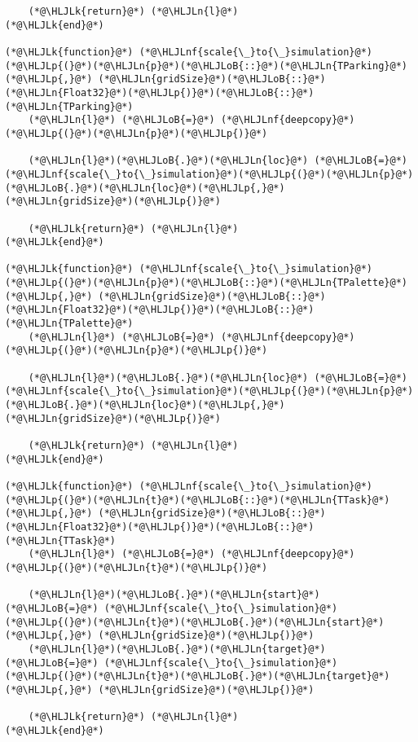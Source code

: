 \documentclass[12pt,a4paper]{article}
\newcommand{\HLJLk}[1]{\textcolor[RGB]{148,91,176}{\textbf{#1}}}
\newcommand{\HLJLn}[1]{#1}
\newcommand{\HLJLnf}[1]{\textcolor[RGB]{66,102,213}{#1}}
\newcommand{\HLJLoB}[1]{\textcolor[RGB]{102,102,102}{\textbf{#1}}}
\newcommand{\HLJLp}[1]{#1}
\begin{document}
\begin{lstlisting}
    (*@\HLJLk{return}@*) (*@\HLJLn{l}@*)
(*@\HLJLk{end}@*)

(*@\HLJLk{function}@*) (*@\HLJLnf{scale{\_}to{\_}simulation}@*)(*@\HLJLp{(}@*)(*@\HLJLn{p}@*)(*@\HLJLoB{::}@*)(*@\HLJLn{TParking}@*)(*@\HLJLp{,}@*) (*@\HLJLn{gridSize}@*)(*@\HLJLoB{::}@*)(*@\HLJLn{Float32}@*)(*@\HLJLp{)}@*)(*@\HLJLoB{::}@*)(*@\HLJLn{TParking}@*)
    (*@\HLJLn{l}@*) (*@\HLJLoB{=}@*) (*@\HLJLnf{deepcopy}@*)(*@\HLJLp{(}@*)(*@\HLJLn{p}@*)(*@\HLJLp{)}@*)

    (*@\HLJLn{l}@*)(*@\HLJLoB{.}@*)(*@\HLJLn{loc}@*) (*@\HLJLoB{=}@*) (*@\HLJLnf{scale{\_}to{\_}simulation}@*)(*@\HLJLp{(}@*)(*@\HLJLn{p}@*)(*@\HLJLoB{.}@*)(*@\HLJLn{loc}@*)(*@\HLJLp{,}@*) (*@\HLJLn{gridSize}@*)(*@\HLJLp{)}@*)

    (*@\HLJLk{return}@*) (*@\HLJLn{l}@*)
(*@\HLJLk{end}@*)

(*@\HLJLk{function}@*) (*@\HLJLnf{scale{\_}to{\_}simulation}@*)(*@\HLJLp{(}@*)(*@\HLJLn{p}@*)(*@\HLJLoB{::}@*)(*@\HLJLn{TPalette}@*)(*@\HLJLp{,}@*) (*@\HLJLn{gridSize}@*)(*@\HLJLoB{::}@*)(*@\HLJLn{Float32}@*)(*@\HLJLp{)}@*)(*@\HLJLoB{::}@*)(*@\HLJLn{TPalette}@*)
    (*@\HLJLn{l}@*) (*@\HLJLoB{=}@*) (*@\HLJLnf{deepcopy}@*)(*@\HLJLp{(}@*)(*@\HLJLn{p}@*)(*@\HLJLp{)}@*)

    (*@\HLJLn{l}@*)(*@\HLJLoB{.}@*)(*@\HLJLn{loc}@*) (*@\HLJLoB{=}@*) (*@\HLJLnf{scale{\_}to{\_}simulation}@*)(*@\HLJLp{(}@*)(*@\HLJLn{p}@*)(*@\HLJLoB{.}@*)(*@\HLJLn{loc}@*)(*@\HLJLp{,}@*) (*@\HLJLn{gridSize}@*)(*@\HLJLp{)}@*)

    (*@\HLJLk{return}@*) (*@\HLJLn{l}@*)
(*@\HLJLk{end}@*)

(*@\HLJLk{function}@*) (*@\HLJLnf{scale{\_}to{\_}simulation}@*)(*@\HLJLp{(}@*)(*@\HLJLn{t}@*)(*@\HLJLoB{::}@*)(*@\HLJLn{TTask}@*)(*@\HLJLp{,}@*) (*@\HLJLn{gridSize}@*)(*@\HLJLoB{::}@*)(*@\HLJLn{Float32}@*)(*@\HLJLp{)}@*)(*@\HLJLoB{::}@*)(*@\HLJLn{TTask}@*)
    (*@\HLJLn{l}@*) (*@\HLJLoB{=}@*) (*@\HLJLnf{deepcopy}@*)(*@\HLJLp{(}@*)(*@\HLJLn{t}@*)(*@\HLJLp{)}@*)

    (*@\HLJLn{l}@*)(*@\HLJLoB{.}@*)(*@\HLJLn{start}@*) (*@\HLJLoB{=}@*) (*@\HLJLnf{scale{\_}to{\_}simulation}@*)(*@\HLJLp{(}@*)(*@\HLJLn{t}@*)(*@\HLJLoB{.}@*)(*@\HLJLn{start}@*)(*@\HLJLp{,}@*) (*@\HLJLn{gridSize}@*)(*@\HLJLp{)}@*)
    (*@\HLJLn{l}@*)(*@\HLJLoB{.}@*)(*@\HLJLn{target}@*) (*@\HLJLoB{=}@*) (*@\HLJLnf{scale{\_}to{\_}simulation}@*)(*@\HLJLp{(}@*)(*@\HLJLn{t}@*)(*@\HLJLoB{.}@*)(*@\HLJLn{target}@*)(*@\HLJLp{,}@*) (*@\HLJLn{gridSize}@*)(*@\HLJLp{)}@*)

    (*@\HLJLk{return}@*) (*@\HLJLn{l}@*)
(*@\HLJLk{end}@*)


\end{lstlisting}
\end{document}

